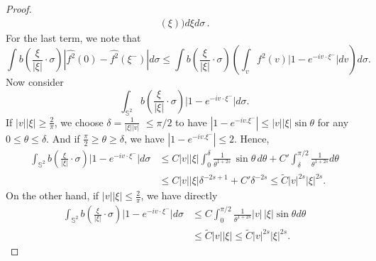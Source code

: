 \documentclass{amsart}[12pt, article]
\begin{document}
\begin{proof}
\begin{align*}
(\xi ) \Big)d\xi d\sigma\, .
\end{align*}
For the last term, we note that
$$
\int b\left(\frac{\xi}{|\xi|}\cdot \sigma \right) | \widehat{f^2} (0)
- \widehat{f^2} (\xi^- ) |d\sigma
 \leq \int b\left(\frac{\xi}{|\xi|}\cdot \sigma \right)
 \left(\int_v f^2 (v) \Big| 1- e^{-iv\cdot\xi^-}
 \Big| dv\right) d\sigma.
$$
Now consider
$$
\int_{{\mathbb{S}}^2} b\left(\frac{\xi}{|\xi|}\cdot \sigma \right) \Big| 1-
e^{-iv\cdot\xi^-} \Big| d\sigma.
$$
If $| v| | \xi | \geq \frac{2}{\pi}$, we choose $\delta = \frac{1}{
|\xi| |v|}\,\,  \leq \pi /2 $ to have $| 1- e^{-iv.\xi^-} | \leq |
v| | \xi | \sin \theta$ for any $0 \leq \theta \leq \delta $. And
if ${\frac\pi 2} \geq \theta \geq \delta$, we have $| 1-
e^{-iv.\xi^-} | \leq 2$. Hence,
\begin{align*}
\int_{{\mathbb{S}}^2} b\left(\frac{\xi}{|\xi|}\cdot \sigma \right) \Big| 1-
e^{-iv\cdot\xi^-} \Big| d\sigma&\leq C | v | | \xi | \int^\delta_0
\frac{1}{{\theta^{1+2s}}} \,\sin \theta \,d\theta + C' \int^{\pi
/2}_\delta \frac{1}{\theta^{1+2s}} d\theta\\
&\leq C | v | | \xi | \delta^{-2s +1 } + C' \delta^{-2s} \leq \tilde
C | v|^{2s} | \xi |^{2s}.
\end{align*}
On the other hand, if $| v| | \xi| \leq  \frac{2}{\pi}$, we have directly
\begin{align*}
\int_{{\mathbb{S}}^2} b\left(\frac{\xi}{|\xi|}\cdot \sigma \right) \Big| 1-
e^{-iv\cdot\xi^-} \Big| d\sigma&\leq C \int^{\pi /2}_0
\frac{1}{{\theta^{1+2s}}} | v |\, | \xi|  \sin \theta  d\theta\\
&\leq \tilde C | v | | \xi | \leq \tilde C | v|^{2s} | \xi |^{2s}.
\end{align*}


\end{proof}
\end{document}
